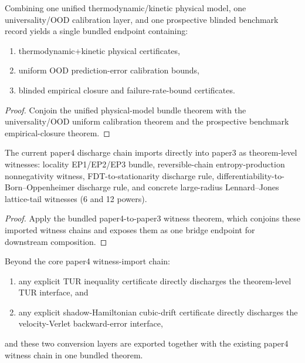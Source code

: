 \begin{theorem}\label{thm:unified-physical-ood-prospective-bundle}
Combining one unified thermodynamic/kinetic physical model, one universality/OOD calibration layer, and one prospective blinded benchmark record yields a single bundled endpoint containing:
\begin{enumerate}
\item thermodynamic+kinetic physical certificates,
\item uniform OOD prediction-error calibration bounds,
\item blinded empirical closure and failure-rate-bound certificates.
\end{enumerate}
\end{theorem}

\begin{proof}
Conjoin the unified physical-model bundle theorem with the universality/OOD uniform calibration theorem and the prospective benchmark empirical-closure theorem.
\end{proof}

\begin{theorem}\label{thm:paper4-witness-chain-import}
The current paper4 discharge chain imports directly into paper3 as theorem-level witnesses: locality EP1/EP2/EP3 bundle, reversible-chain entropy-production nonnegativity witness, FDT-to-stationarity discharge rule, differentiability-to-Born--Oppenheimer discharge rule, and concrete large-radius Lennard--Jones lattice-tail witnesses (6 and 12 powers).
\end{theorem}

\begin{proof}
Apply the bundled paper4-to-paper3 witness theorem, which conjoins these imported witness chains and exposes them as one bridge endpoint for downstream composition.
\end{proof}

\begin{theorem}\label{thm:paper4-interface-discharge-extensions}
Beyond the core paper4 witness-import chain:
\begin{enumerate}
\item any explicit TUR inequality certificate directly discharges the theorem-level TUR interface, and
\item any explicit shadow-Hamiltonian cubic-drift certificate directly discharges the velocity-Verlet backward-error interface,
\end{enumerate}
and these two conversion layers are exported together with the existing paper4 witness chain in one bundled theorem.
\end{theorem}

